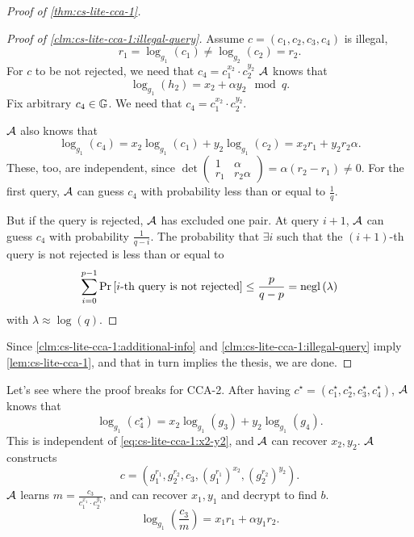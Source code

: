 \begin{proof}[Proof of \cref{thm:cs-lite-cca-1}]
	\begin{proof}[Proof of \cref{clm:cs-lite-cca-1:illegal-query}]
		Assume $c = (c_1, c_2, c_3, c_4)$ is illegal, \ie
		\begin{equation*}
			r_1 = \log_{g_1}(c_1) \neq \log_{g_2}(c_2) = r_2.
		\end{equation*}
		For $c$ to be not rejected, we need that $c_4 = c_1^{x_2} \cdot c_2^{y_2}$
		$\mathcal{A}$ knows that
		\begin{equation} \label{eq:cs-lite-cca-1:x2-y2}
			\log_{g_1}(h_2) = x_2 + \alpha y_2 \mod q.
		\end{equation}
		Fix arbitrary $c_4 \in \mathbb{G}$.
		We need that $c_4 = c_1^{x_2} \cdot c_2^{y_2}$.

		$\mathcal{A}$ also knows that
		\begin{equation*}
			\log_{g_1}(c_4) = x_2 \log_{g_1} (c_1) + y_2 \log_{g_1}(c_2) = x_2 r_1 + y_2 r_2 \alpha.
		\end{equation*}
		These, too, are independent, since $\det \left( \begin{smallmatrix}1 & \alpha \\ r_1 & r_2 \alpha\end{smallmatrix} \right) = \alpha (r_2 - r_1) \neq 0$.
		For the first query, $\mathcal{A}$ can guess $c_4$ with probability less than or equal to $\frac{1}{q}$.

		But if the query is rejected, $\mathcal{A}$ has excluded one pair.
		At query $i+1$, $\mathcal{A}$ can guess $c_4$ with probability $\frac{1}{q-i}$.
		The probability that $\exists i$ such that the $(i+1)$-th query is not rejected is less than or equal to
		\begin{equation*}
			\sum_{i = 0}^{p-1} \mathop{\mathrm{Pr}}\limits_{} \left[ { \text{$i$-th query is not rejected}} \right] \le \frac{p}{q-p} = \mathrm{negl}\left({\lambda}\right)
		\end{equation*}
		with $\lambda \approx \log(q)$.
	\end{proof}

	Since \cref{clm:cs-lite-cca-1:additional-info} and \cref{clm:cs-lite-cca-1:illegal-query} imply \cref{lem:cs-lite-cca-1}, and that in turn implies the thesis, we are done.
\end{proof}

Let's see where the proof breaks for \ac{CCA}-2.
After having $c^{\star} = (c_1^{\star}, c_2^{\star}, c_3^{\star}, c_4^{\star})$, $\mathcal{A}$ knows that
\begin{equation*}
	\log_{g_1}(c_4^{\star}) = x_2 \log_{g_1}(g_3) + y_2 \log_{g_1}(g_4).
\end{equation*}
This is independent of \cref{eq:cs-lite-cca-1:x2-y2}, and $\mathcal{A}$ can recover $x_2, y_2$.
$\mathcal{A}$ constructs
\begin{equation*}
	c = \left(g_1^{r_1}, g_2^{r_2}, c_3, {(g_1^{r_1})}^{x_2}, {(g_2^{r_2})}^{y_2} \right).
\end{equation*}
$\mathcal{A}$ learns $m = \frac{c_3}{c_1^{x_1} \cdot c_2^{y_1}}$, and can recover $x_1, y_1$ and decrypt to find $b$.
\begin{equation*}
	\log_{g_1} \left( \frac{c_3}{m} \right) = x_1 r_1 + \alpha y_1 r_2.
\end{equation*}

